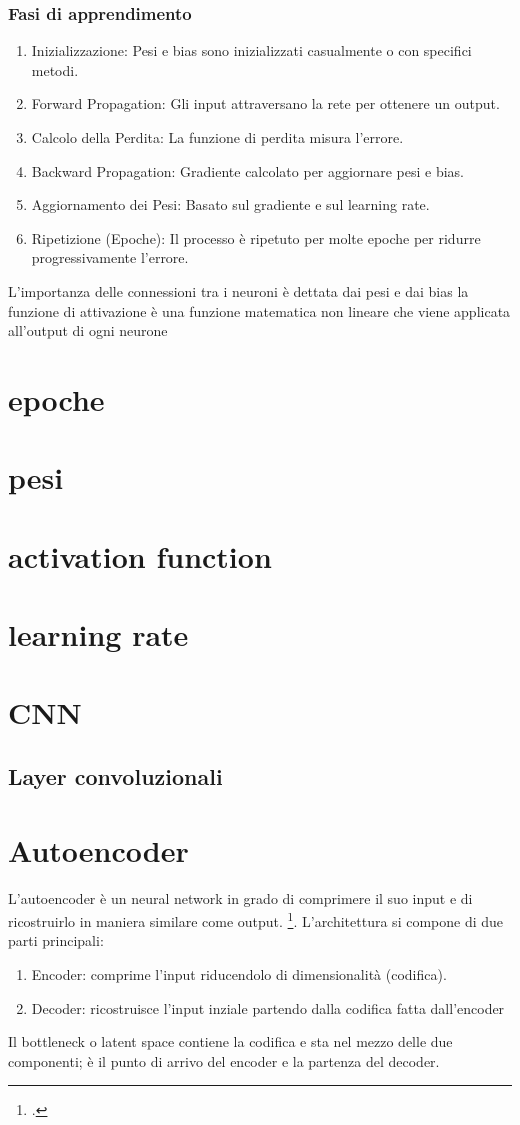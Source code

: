 \subsubsection{Fasi di apprendimento}
\begin{enumerate}
    \item Inizializzazione: Pesi e bias sono inizializzati casualmente o con specifici metodi.
    \item Forward Propagation: Gli input attraversano la rete per ottenere un output.
    \item Calcolo della Perdita: La funzione di perdita misura l'errore.
    \item Backward Propagation: Gradiente calcolato per aggiornare pesi e bias.
    \item Aggiornamento dei Pesi: Basato sul gradiente e sul learning rate.
    \item Ripetizione (Epoche): Il processo è ripetuto per molte epoche per ridurre progressivamente l'errore.
\end{enumerate}
L'importanza delle connessioni tra i neuroni è dettata dai pesi e dai bias
la funzione di attivazione è una funzione matematica non lineare che viene applicata all'output di ogni neurone
\section{epoche}
\section{pesi}
\section{activation function}
\section{learning rate}

\section{CNN}
\subsection{Layer convoluzionali}

\section{Autoencoder}
L'autoencoder è un neural network in grado di comprimere il suo input e di ricostruirlo in maniera similare come output. \footcite[p.~499]{Goodfellow-et-al-2016}.
L'architettura si compone di due parti principali:
\begin{enumerate}
    \item Encoder: comprime l'input riducendolo di dimensionalità (codifica).
    \item Decoder: ricostruisce l'input inziale partendo dalla codifica fatta dall'encoder
\end{enumerate}
Il bottleneck o latent space contiene la codifica e sta nel mezzo delle due componenti; è il punto di arrivo del encoder e la partenza del decoder.

